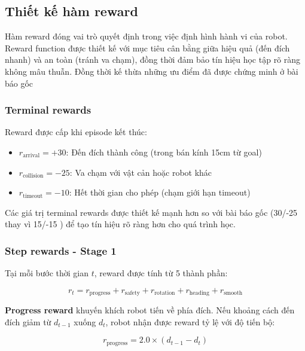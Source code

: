 \subsection{Thiết kế hàm reward}
\label{sec:reward_design}

Hàm reward đóng vai trò quyết định trong việc định hình hành vi của robot. Reward function được thiết kế với mục tiêu cân bằng giữa hiệu quả (đến đích nhanh) và an toàn (tránh va chạm), đồng thời đảm bảo tín hiệu học tập rõ ràng không mâu thuẫn. Đồng thời kế thừa những ưu điểm đã được chứng minh ở bài báo gốc \cite{long2018towards}

\subsubsection{Terminal rewards}

Reward được cấp khi episode kết thúc:

\begin{itemize}[nosep]
\item $r_{\text{arrival}} = +30$: Đến đích thành công (trong bán kính 15cm từ goal)
\item $r_{\text{collision}} = -25$: Va chạm với vật cản hoặc robot khác
\item $r_{\text{timeout}} = -10$: Hết thời gian cho phép (chạm giới hạn timeout)
\end{itemize}

Các giá trị terminal rewards được thiết kế mạnh hơn so với bài báo gốc (30/-25 thay vì 15/-15 \cite{long2018towards}) để tạo tín hiệu rõ ràng hơn cho quá trình học.

\subsubsection{Step rewards - Stage 1}

Tại mỗi bước thời gian $t$, reward được tính từ 5 thành phần:

\begin{equation}
r_t = r_{\text{progress}} + r_{\text{safety}} + r_{\text{rotation}} + r_{\text{heading}} + r_{\text{smooth}}
\label{eq:reward}
\end{equation}

\textbf{Progress reward} khuyến khích robot tiến về phía đích. Nếu khoảng cách đến đích giảm từ $d_{t-1}$ xuống $d_t$, robot nhận được reward tỷ lệ với độ tiến bộ:

\begin{equation}
r_{\text{progress}} = 2.0 \times (d_{t-1} - d_t)
\end{equation}

